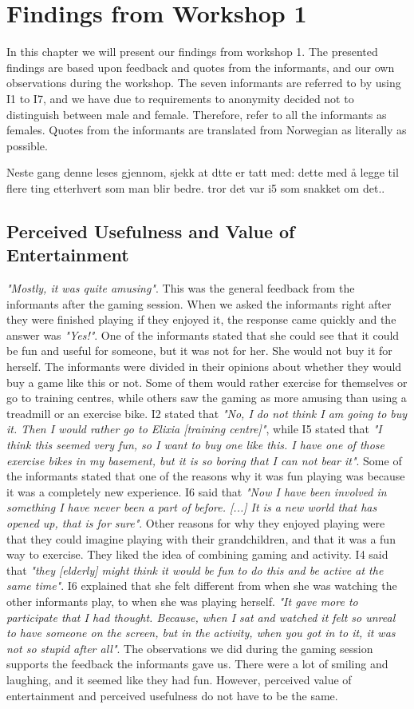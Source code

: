 \chapter{Findings from Workshop 1}
In this chapter we will present our findings from workshop 1. The presented findings are based upon feedback and quotes from the informants, and our own observations during the workshop. The seven informants are referred to by using I1 to I7, and we have due to requirements to anonymity decided not to distinguish between male and female. Therefore, refer to all the informants as females. Quotes from the informants are translated from Norwegian as literally as possible. 


Neste gang denne leses gjennom, sjekk at dtte er tatt med:  dette med å legge til flere ting etterhvert som man blir bedre. tror det var i5 som snakket om det..

\section{Perceived Usefulness and Value of Entertainment}
\emph{"Mostly, it was quite amusing"}. This was the general feedback from the informants after the gaming session. When we asked the informants right after they were finished playing if they enjoyed it, the response came quickly and the answer was \emph{"Yes!"}. One of the informants stated that she could see that it could be fun and useful for someone, but it was not for her. She would not buy it for herself. The informants were divided in their opinions about whether they would buy a game like this or not. Some of them would rather exercise for themselves or go to training centres, while others saw the gaming as more amusing than using a treadmill or an exercise bike. I2 stated that \emph{"No, I do not think I am going to buy it. Then I would rather go to Elixia [training centre]"}, while I5 stated that \emph{"I think this seemed very fun, so I want to buy one like this. I have one of those exercise bikes in my basement, but it is so boring that I can not bear it"}.  Some of the informants stated that one of the reasons why it was fun playing was because it was a completely new experience. I6 said that \emph{"Now I have been involved in something I have never been a part of before. [...] It is a new world that has opened up, that is for sure"}. Other reasons for why they enjoyed playing were that they could imagine playing with their grandchildren, and that it was a fun way to exercise. They liked the idea of combining gaming and activity. I4 said that \emph{"they [elderly] might think it would be fun to do this and be active at the same time"}. I6 explained that she felt different from when she was watching the other informants play, to when she was playing herself. \emph{"It gave more to participate that I had thought. Because, when I sat and watched it felt so unreal to have someone on the screen, but in the activity, when you got in to it, it was not so stupid after all"}. The observations we did during the gaming session supports the feedback the informants gave us. There were a lot of smiling and laughing, and it seemed like they had fun. However, perceived value of entertainment and perceived usefulness do not have to be the same. 

